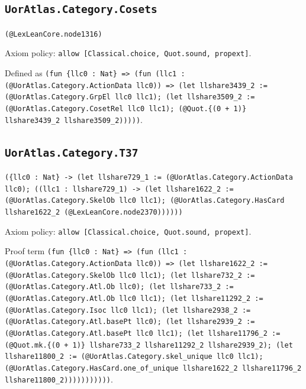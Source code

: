 \documentclass[11pt]{article}
\begin{document}
\subsection*{\texttt{UorAtlas.Category.Cosets}}
\noindent\texttt{(@LexLeanCore.node1316)}\par
\noindent Axiom policy: \texttt{allow [Classical.choice, Quot.sound, propext]}.\par
\noindent Defined as \texttt{(fun \{llc0 : Nat\} => (fun (llc1 : (@UorAtlas.Category.ActionData llc0)) => (let llshare3439\_2 := (@UorAtlas.Category.GrpEl llc0 llc1); (let llshare3509\_2 := (@UorAtlas.Category.CosetRel llc0 llc1); (@Quot.\{(0 + 1)\} llshare3439\_2 llshare3509\_2)))))}.\par
\subsection*{\texttt{UorAtlas.Category.T37}}
\noindent\texttt{(\{llc0 : Nat\} -> (let llshare729\_1 := (@UorAtlas.Category.ActionData llc0); ((llc1 : llshare729\_1) -> (let llshare1622\_2 := (@UorAtlas.Category.SkelOb llc0 llc1); (@UorAtlas.Category.HasCard llshare1622\_2 (@LexLeanCore.node2370))))))}\par
\noindent Axiom policy: \texttt{allow [Classical.choice, Quot.sound, propext]}.\par
\noindent Proof term \texttt{(fun \{llc0 : Nat\} => (fun (llc1 : (@UorAtlas.Category.ActionData llc0)) => (let llshare1622\_2 := (@UorAtlas.Category.SkelOb llc0 llc1); (let llshare732\_2 := (@UorAtlas.Category.Atl.Ob llc0); (let llshare733\_2 := (@UorAtlas.Category.Atl.Ob llc0 llc1); (let llshare11292\_2 := (@UorAtlas.Category.Isoc llc0 llc1); (let llshare2938\_2 := (@UorAtlas.Category.Atl.basePt llc0); (let llshare2939\_2 := (@UorAtlas.Category.Atl.basePt llc0 llc1); (let llshare11796\_2 := (@Quot.mk.\{(0 + 1)\} llshare733\_2 llshare11292\_2 llshare2939\_2); (let llshare11800\_2 := (@UorAtlas.Category.skel\_unique llc0 llc1); (@UorAtlas.Category.HasCard.one\_of\_unique llshare1622\_2 llshare11796\_2 llshare11800\_2)))))))))))}.\par
\end{document}
